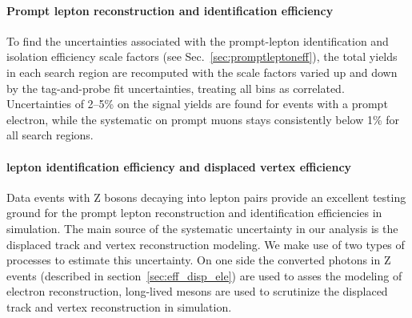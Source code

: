 \paragraph{Prompt lepton reconstruction and identification efficiency}
\label{sec:promptleptoneffsysts}
To find the uncertainties associated with the prompt-lepton
identification and isolation efficiency scale factors (see
Sec.~\ref{sec:promptleptoneff}),
the total yields in each search region are recomputed with the scale
factors varied up and down by the tag-and-probe fit uncertainties,
treating all bins as correlated.
Uncertainties of 2--5\% on the signal yields are found
for events with a prompt electron, while the systematic on prompt
muons stays consistently below 1\% for all search regions.

\paragraph{\Displ lepton identification efficiency and displaced vertex efficiency }
\label{sec:nonpromptleptoneffsysts}
Data events with Z bosons decaying into lepton pairs provide an excellent testing ground for the prompt lepton 
reconstruction and identification efficiencies in simulation.
The main source of the systematic uncertainty in our analysis is the displaced track and vertex reconstruction modeling. 
We make use of two types of processes to estimate this uncertainty. On one side the converted photons in Z events (described in section~\ref{sec:eff_disp_ele}) 
are used to asses the modeling of \displ electron reconstruction,  long-lived \PKzS 
mesons are used to scrutinize the displaced track and vertex reconstruction in simulation. 

